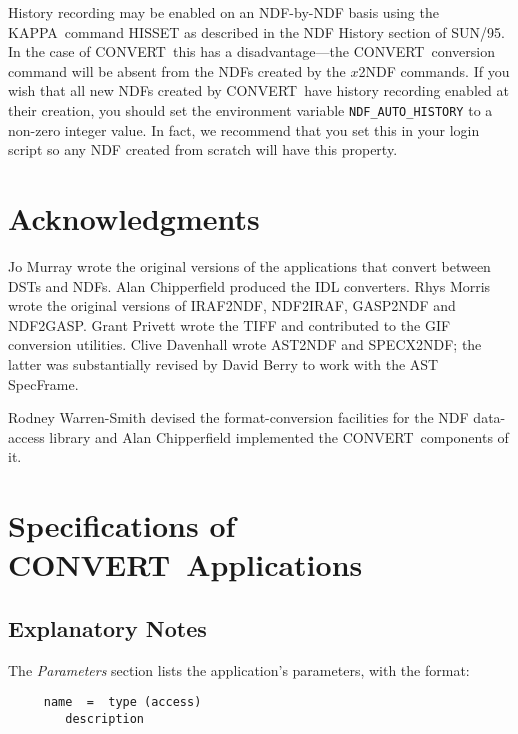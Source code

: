 \documentclass[twoside,11pt]{article}
\newcommand{\xref}[3]{#1}
\newcommand{\xlabel}[1]{}
\newcommand{\CONVERT}{{\footnotesize CONVERT}}
\newcommand{\BCONVERT}{{\normalsize CONVERT}}
\newcommand{\KAPPA}{{\footnotesize KAPPA}}
\newcommand{\KAPPAref}{\xref{\KAPPA}{sun95}{}}
\begin{document}
History recording may be enabled on an NDF-by-NDF basis using the 
\KAPPAref\ command \xref{HISSET}{sun95}{HISSET} as described in the 
\xref{NDF History section of SUN/95}{sun95}{se_conhistory}.  In the
case of \CONVERT\ this has a disadvantage---the \CONVERT\ conversion
command will be absent from the NDFs created by the $x$2NDF commands.
If you wish that all new NDFs created by \CONVERT\ have history
recording enabled at their creation, you should set the environment
variable {\tt NDF\_AUTO\_HISTORY} to a non-zero integer value.  In
fact, we recommend that you set this in your login script so any NDF
created from scratch will have this property.


\section{Acknowledgments}
Jo Murray wrote the original versions of the applications that convert
between DSTs and NDFs.  Alan Chipperfield produced the IDL converters.
Rhys Morris wrote the original versions of IRAF2NDF, NDF2IRAF, GASP2NDF
and NDF2GASP.  Grant Privett wrote the TIFF and contributed to the GIF
conversion utilities.  Clive Davenhall wrote AST2NDF and SPECX2NDF;
the latter was substantially revised by David Berry to work with the
AST SpecFrame.

Rodney Warren-Smith devised the format-conversion facilities for the NDF 
data-access library and Alan Chipperfield implemented the \CONVERT\ components
of it.

\newpage
\appendix

\section[Specifications of {\small \bf CONVERT} Applications]
{\label{app_full}Specifications of \BCONVERT\ Applications}
\subsection{\xlabel{explanatory_notes}Explanatory Notes}

The {\em Parameters\/} section \label{app_parameters}
lists the application's parameters, with the format:

\begin{verbatim}
     name  =  type (access)
        description
\end{verbatim}
\end{document}
